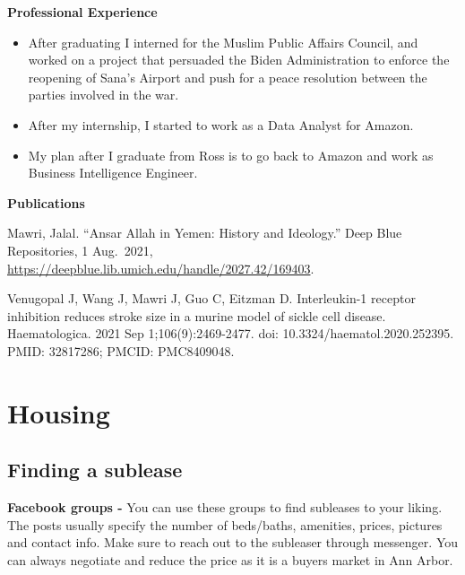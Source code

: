 \documentclass[
]{book}
\providecommand{\tightlist}{%
  \setlength{\itemsep}{0pt}\setlength{\parskip}{0pt}}
\begin{document}
\textbf{Professional Experience}

\begin{itemize}
\tightlist
\item
  After graduating I interned for the Muslim Public Affairs Council, and worked on a project that persuaded the Biden Administration to enforce the reopening of Sana's Airport and push for a peace resolution between the parties involved in the war.
\item
  After my internship, I started to work as a Data Analyst for Amazon.
\item
  My plan after I graduate from Ross is to go back to Amazon and work as Business Intelligence Engineer.
\end{itemize}

\textbf{Publications}

Mawri, Jalal. ``Ansar Allah in Yemen: History and Ideology.'' Deep Blue Repositories, 1 Aug.~2021, \url{https://deepblue.lib.umich.edu/handle/2027.42/169403}.

Venugopal J, Wang J, Mawri J, Guo C, Eitzman D. Interleukin-1 receptor inhibition reduces stroke size in a murine model of sickle cell disease. Haematologica. 2021 Sep 1;106(9):2469-2477. doi: 10.3324/haematol.2020.252395. PMID: 32817286; PMCID: PMC8409048.

\hypertarget{housing}{%
\chapter{Housing}\label{housing}}

\hypertarget{finding-a-sublease}{%
\section{Finding a sublease}\label{finding-a-sublease}}

\textbf{Facebook groups -}
You can use these groups to find subleases to your liking. The posts usually specify the number of beds/baths, amenities, prices, pictures and contact info. Make sure to reach out to the subleaser through messenger. You can always negotiate and reduce the price as it is a buyers market in Ann Arbor.
\end{document}
